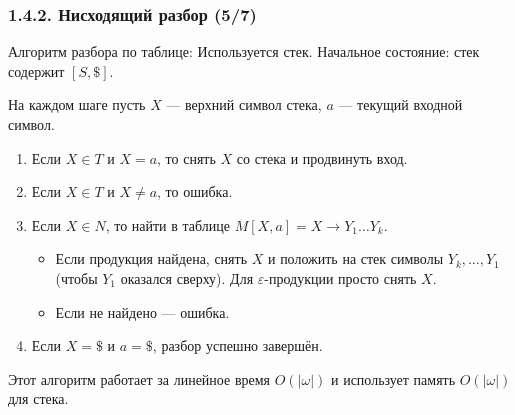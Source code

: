 \begin{frame}
\frametitle{1.4.2. Нисходящий разбор (5/7)}

Алгоритм разбора по таблице:
Используется стек. Начальное состояние: стек содержит $[S, \$]$.

На каждом шаге пусть $X$ — верхний символ стека, $a$ — текущий входной символ.

\begin{enumerate}
    \item Если $X \in T$ и $X = a$, то снять $X$ со стека и продвинуть вход.
    \item Если $X \in T$ и $X \ne a$, то ошибка.
    \item Если $X \in N$, то найти в таблице $M[X, a] = X \to Y_1 \dots Y_k$.
        \begin{itemize}
            \item Если продукция найдена, снять $X$ и положить на стек символы $Y_k, \dots, Y_1$ (чтобы $Y_1$ оказался сверху). Для $\varepsilon$-продукции просто снять $X$.
            \item Если не найдено — ошибка.
        \end{itemize}
    \item Если $X = \$$ и $a = \$$, разбор успешно завершён.
\end{enumerate}

\begin{remark}
Этот алгоритм работает за линейное время $O(|\omega|)$ и использует память $O(|\omega|)$ для стека.
\end{remark}

\end{frame}

